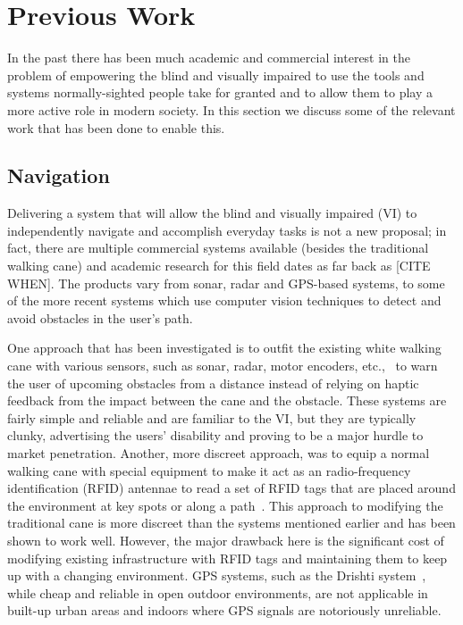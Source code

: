 \documentclass[format=sigconf, review=true, screen=true, anonymous=true]{acmart}
\begin{document}
\section{Previous Work}
\label{sec:lit-review}

In the past there has been much academic and commercial interest in the problem of empowering the blind and visually impaired to use the tools and systems normally-sighted people take for granted and to allow them to play a more active role in modern society. In this section we discuss some of the relevant work that has been done to enable this. 

\subsection{Navigation}

Delivering a system that will allow the blind and visually impaired (VI) to independently navigate and accomplish everyday tasks is not a new proposal; in fact, there are multiple commercial systems available (besides the traditional walking cane) and academic research for this field dates as far back as [CITE WHEN]. The products vary from sonar, radar and GPS-based systems, to some of the more recent systems which use computer vision techniques to detect and avoid obstacles in the user's path. 

One approach that has been investigated is to outfit the existing white walking cane with various sensors, such as sonar, radar, motor encoders, etc.,~\cite{ulrich1997, marion2008batcane} to warn the user of upcoming obstacles from a distance instead of relying on haptic feedback from the impact between the cane and the obstacle. These systems are fairly simple and reliable and are familiar to the VI, but they are typically clunky, advertising the users' disability and proving to be a major hurdle to market penetration. Another, more discreet approach, was to equip a normal walking cane with special equipment to make it act as an radio-frequency identification (RFID) antennae to read a set of RFID tags that are placed around the environment at key spots or along a path~\cite{faria2010electronic, willis2005}. This approach to modifying the traditional cane is more discreet than the systems mentioned earlier and has been shown to work well. However, the major drawback here is the significant cost of modifying existing infrastructure with RFID tags and maintaining them to keep up with a changing environment. GPS systems, such as the Drishti system~\cite{ran2004drishti}, while cheap and reliable in open outdoor environments, are not applicable in built-up urban areas and indoors where GPS signals are notoriously unreliable. 
\end{document}
